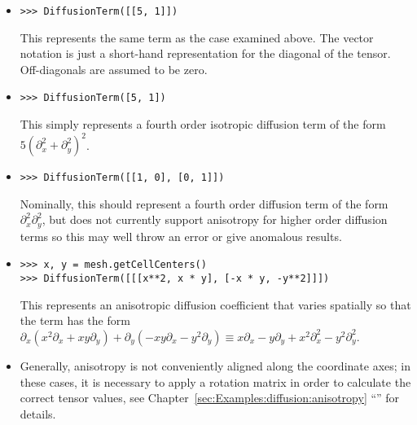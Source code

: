           \begin{itemize}

            \item
\begin{verbatim}
>>> DiffusionTerm([[5, 1]])
\end{verbatim}
              This represents the same term as the case examined above.
              The vector notation is just a short-hand representation
              for the diagonal of the tensor. Off-diagonals are assumed
              to be zero.

            \item
\begin{verbatim}
>>> DiffusionTerm([5, 1])
\end{verbatim}
              This simply represents a fourth order isotropic diffusion
              term of the form $5 \left( \partial_x^2 + \partial_y^2
              \right)^2$.

            \item 
\begin{verbatim}
>>> DiffusionTerm([[1, 0], [0, 1]])
\end{verbatim}
              Nominally, this should represent a fourth order diffusion
              term of the form $\partial_x^2 \partial_y^2$, but \FiPy{}
              does not currently support anisotropy for higher order
              diffusion terms so this may well throw an error or give
              anomalous results.
            
            \item
\begin{verbatim}
>>> x, y = mesh.getCellCenters()
>>> DiffusionTerm([[[x**2, x * y], [-x * y, -y**2]]])
\end{verbatim}
              This represents an anisotropic diffusion coefficient that
              varies spatially so that the term has the form 
              $\partial_x (x^2 \partial_x + x y \partial_y)
              + \partial_y (-x y \partial_x - y^2 \partial_y)
              \equiv x \partial_x - y \partial_y + x^2 \partial_x^2 - y^2
              \partial_y^2$.

            \item Generally, anisotropy is not conveniently aligned
              along the coordinate axes; in these cases, it is necessary
              to apply a rotation matrix in order to calculate the
              correct tensor values, see
              Chapter~\ref{sec:Examples:diffusion:anisotropy}
              ``'' for
              details.

            \end{itemize}

